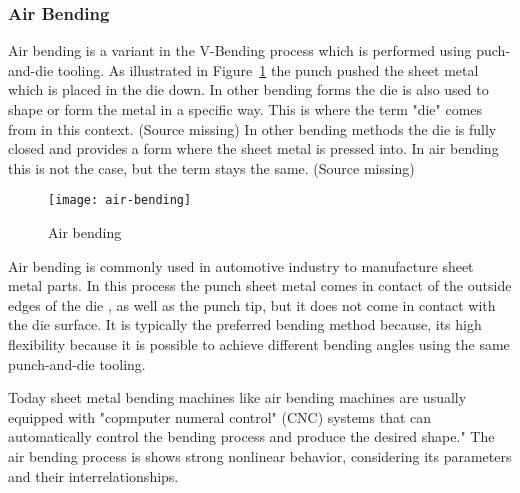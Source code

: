 \subsubsection{Air Bending}
Air bending is a variant in the V-Bending process which is performed using puch-and-die
tooling.
\cite[p. 416]{groover_fundamentalsmodernmanufacturing_2020}
As illustrated in Figure~\ref{fig:air-bending} the punch pushed the sheet metal which
is placed
in the die down.
In other bending forms the die is also used to shape or form the metal in a specific
way. This is
where the term "die" comes from in this context. (Source missing)
In other bending methods the die is fully closed and provides a form where the sheet
metal is
pressed into. In air bending this is not the case, but the term stays the same. (Source
missing)

\begin{figure}[H]
    \centering
    \texttt{[image: air-bending]}
    \caption{Air bending \cite[p. 416]{groover_fundamentalsmodernmanufacturing_2020}}
    \label{fig:air-bending}
\end{figure}

Air bending is commonly used in automotive industry to manufacture sheet metal parts. \cite[p.
342]{kim_predictionbendallowance_2007}
In this process the punch sheet metal comes in contact of the outside edges of the die
, as well
as the punch tip, but it does not come in contact with the die surface.
It is typically the preferred bending method because, its high flexibility because it
is possible
to achieve different bending angles using the same punch-and-die tooling.
\cite[p. 3]{miranda_formingspringbackprediction_2018}\cite[p.
1]{cruz_applicationmachinelearning_2021}

Today sheet metal bending machines like air bending machines are usually equipped with
"copmputer
numeral control" (CNC) systems that can automatically control the bending process and
produce the
desired shape." \cite[p. 3]{miranda_formingspringbackprediction_2018}
The air bending process is shows strong nonlinear behavior, considering its parameters
and their
interrelationships. \cite[p. 3]{miranda_formingspringbackprediction_2018}


